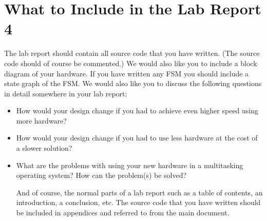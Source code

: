 \documentclass[a4paper]{article}
\begin{document}
\section{What to Include in the Lab Report 4}
The lab report should contain all source code that you have written. (The source code should of course be commented.) We would also like you to include a block diagram of your hardware. If you have written any FSM you should include a state graph of the FSM.
We would also like you to discuss the following questions in detail somewhere in your lab report:
\begin{itemize}

\item How would your design change if you had to achieve even higher speed using more hardware?
\item How would your design change if you had to use less hardware at the cost of a slower solution?
\item What are the problems with using your new hardware in a multitasking operating system? How can the problem(s) be solved?

And of course, the normal parts of a lab report such as a table of contents, an introduction, a conclusion, etc. The source code that you have written should be included in appendices and referred to from the main document.

\end{itemize}
\end{document}

